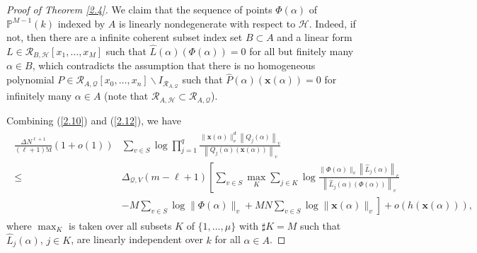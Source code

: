 \documentclass[12pt,leqno]{amsart}
\numberwithin{equation}{section}
\begin{document}
\begin{proof}[Proof of Theorem \ref{2.4}]
We claim that the sequence of points $\Phi(\alpha)$ of $\mathbb{P}^{M-1}(k)$ indexed by $A$ is linearly nondegenerate with respect to $\mathcal{H}$. Indeed, if not, then there are a infinite coherent subset index set $B \subset A$ and a linear form $L \in \mathcal{R}_{B, \mathcal{H}}\left[x_1, \ldots, x_M\right]$ such that $\widehat{L}(\alpha)(\Phi(\alpha))=0$ for all but finitely many $\alpha \in B$, which contradicts the assumption that there is no homogeneous polynomial $P \in \mathcal{R}_{A, \mathcal{Q}}\left[x_0, \ldots, x_n\right] \backslash I_{\mathcal{R}_{A, \mathcal{Q}}}$ such that $\widehat{P}(\alpha)(\mathbf{x}(\alpha))=0$ for infinitely many $\alpha \in A$ (note that $\mathcal{R}_{A, \mathcal{H}} \subset \mathcal{R}_{A, \mathcal{Q}}$).

Combining (\ref{2.10}) and (\ref{2.12}), we have
\begin{align}\label{2.13}
\begin{split}
\frac{\Delta N^{\ell+1}}{(\ell+1)!d}(1+o(1))&\sum_{v \in S} \log \prod_{j=1}^q \frac{\|\mathbf{x}(\alpha)\|_v^d\left\|Q_j(\alpha)\right\|_v}{\left\|Q_j(\alpha)(\mathbf{x}(\alpha))\right\|_v} \\
\leqslant &\Delta_{\mathcal Q,V}(m-\ell+1)\left[\sum_{v \in S} \max _K \sum_{j \in K} \log \frac{\|\Phi(\alpha)\|_v\left\|\widehat{L}_j(\alpha)\right\|_v}{\left\|\widehat{L}_j(\alpha)(\Phi(\alpha))\right\|_v}\right.\\
&\left.-M \sum_{v \in S} \log \|\Phi(\alpha)\|_v+MN \sum_{v \in S} \log \|\mathbf{x}(\alpha)\|_v\right]+o(h(\mathbf{x}(\alpha))),
\end{split}
\end{align}
where $\max _K$ is taken over all subsets $K$ of $\{1, \ldots, \mu\}$ with $\sharp K=M$ such that $\widehat{L}_j(\alpha)$, $j \in K$, are linearly independent over $k$ for all $\alpha \in A$. 


\end{proof}
\end{document}
